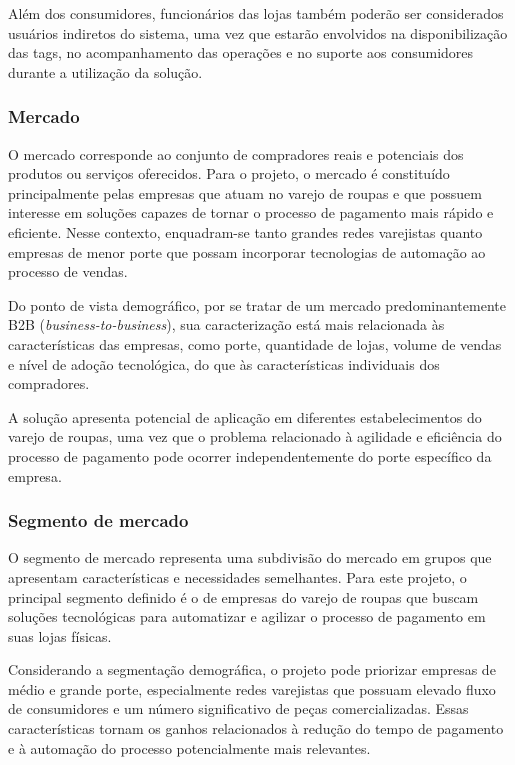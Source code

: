 Além dos consumidores, funcionários das lojas também poderão ser considerados usuários indiretos do sistema, uma vez que estarão envolvidos na disponibilização das tags, no acompanhamento das operações e no suporte aos consumidores durante a utilização da solução.

\subsubsection{Mercado}
\label{subsubsec:mercado}

O mercado corresponde ao conjunto de compradores reais e potenciais dos produtos ou serviços oferecidos. Para o projeto, o mercado é constituído principalmente pelas empresas que atuam no varejo de roupas e que possuem interesse em soluções capazes de tornar o processo de pagamento mais rápido e eficiente. Nesse contexto, enquadram-se tanto grandes redes varejistas quanto empresas de menor porte que possam incorporar tecnologias de automação ao processo de vendas.

Do ponto de vista demográfico, por se tratar de um mercado predominantemente B2B (\textit{business-to-business}), sua caracterização está mais relacionada às características das empresas, como porte, quantidade de lojas, volume de vendas e nível de adoção tecnológica, do que às características individuais dos compradores.

A solução apresenta potencial de aplicação em diferentes estabelecimentos do varejo de roupas, uma vez que o problema relacionado à agilidade e eficiência do processo de pagamento pode ocorrer independentemente do porte específico da empresa.

\subsubsection{Segmento de mercado}
\label{subsubsec:segmento_mercado}

O segmento de mercado representa uma subdivisão do mercado em grupos que apresentam características e necessidades semelhantes. Para este projeto, o principal segmento definido é o de empresas do varejo de roupas que buscam soluções tecnológicas para automatizar e agilizar o processo de pagamento em suas lojas físicas.

Considerando a segmentação demográfica, o projeto pode priorizar empresas de médio e grande porte, especialmente redes varejistas que possuam elevado fluxo de consumidores e um número significativo de peças comercializadas. Essas características tornam os ganhos relacionados à redução do tempo de pagamento e à automação do processo potencialmente mais relevantes.


